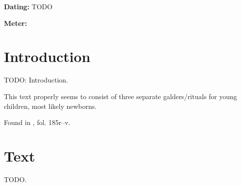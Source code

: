 
\begin{flushright}%
\textbf{Dating:} TODO

\textbf{Meter:} \Fornyrdislag%
\end{flushright}

\section{Introduction}

TODO: Introduction.

This text properly seems to consist of three separate galders/rituals for young children, most likely newborns.

Found in \Lacnunga, fol. 185r--v.

\sectionline

\section{Text}

TODO.

\sectionline
